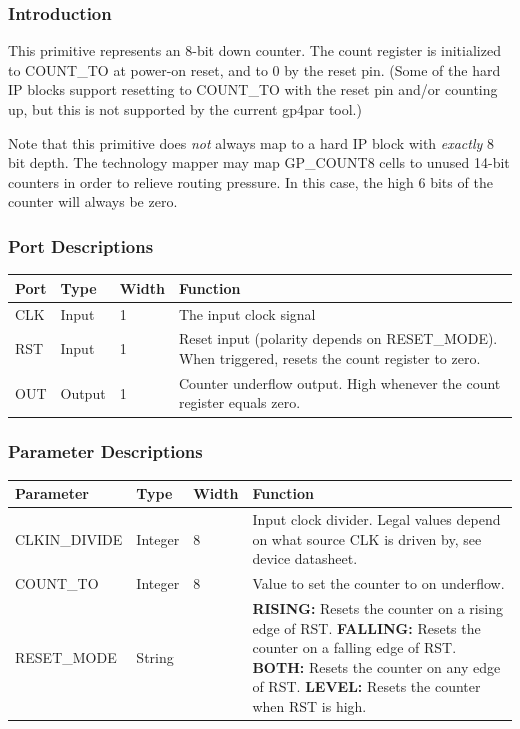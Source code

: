 \documentclass{article}
\begin{document}
\subsubsection{Introduction}
This primitive represents an 8-bit down counter. The count register is initialized to COUNT\_TO at power-on reset, and 
to 0 by the reset pin. (Some of the hard IP blocks support resetting to COUNT\_TO with the reset pin and/or counting 
up, but this is not supported by the current gp4par tool.)

Note that this primitive does \emph{not} always map to a hard IP block with \emph{exactly} 8 bit depth. The technology 
mapper may map GP\_COUNT8 cells to unused 14-bit counters in order to relieve routing pressure. In this case, the high 
6 bits of the counter will always be zero.

\subsubsection{Port Descriptions}

\begin{tabularx}{5in}{|l|l|l|X|}
\hline
{\bfseries Port} & {\bfseries Type} & {\bfseries Width} & {\bfseries Function} \\
\hline
CLK & Input & 1 & The input clock signal\\
\hline
RST & Input & 1 & Reset input (polarity depends on RESET\_MODE). When triggered, resets the count register to zero. \\
\hline
OUT & Output & 1 & Counter underflow output. High whenever the count register equals zero. \\
\hline
\end{tabularx}

\subsubsection{Parameter Descriptions}

\begin{tabularx}{5in}{|l|l|l|X|}
\hline
{\bfseries Parameter} & {\bfseries Type} & {\bfseries Width} & {\bfseries Function} \\
\hline
CLKIN\_DIVIDE & Integer & 8 &
	Input clock divider. Legal values depend on what source CLK is driven by, see device datasheet.\\
\hline
COUNT\_TO & Integer & 8 & Value to set the counter to on underflow. \\
\hline
RESET\_MODE & String &  & 
	{\bfseries RISING: } \newline Resets the counter on a rising edge of RST. \newline
	{\bfseries FALLING: } \newline Resets the counter on a falling edge of RST. \newline
	{\bfseries BOTH: } \newline Resets the counter on any edge of RST. \newline
	{\bfseries LEVEL: } \newline Resets the counter when RST is high. \\
\hline
\end{tabularx}
\end{document}
